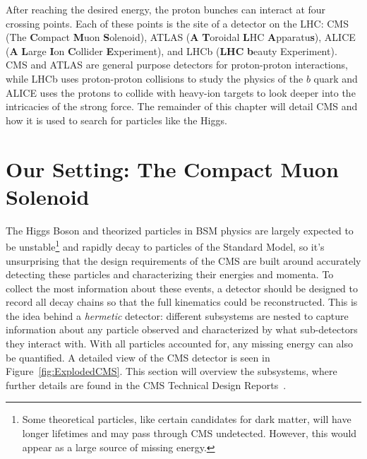 After reaching the desired energy, the proton bunches can interact at four crossing points. Each of these points is the site of a detector on the LHC: CMS (The \textbf{C}ompact \textbf{M}uon \textbf{S}olenoid), ATLAS (\textbf{A} \textbf{T}oroidal \textbf{L}HC \textbf{A}pparatu\textbf{s}), ALICE (\textbf{A} \textbf{L}arge \textbf{I}on \textbf{C}ollider \textbf{E}xperiment), and LHCb (\textbf{LHC} \textbf{b}eauty Experiment). CMS and ATLAS are general purpose detectors for proton-proton interactions, while LHCb uses proton-proton collisions to study the physics of the $b$ quark and ALICE uses the protons to collide with heavy-ion targets to look deeper into the intricacies of the strong force. The remainder of this chapter will detail CMS and how it is used to search for particles like the Higgs.

\section{Our Setting: The Compact Muon Solenoid}
\label{sec:CMS}

The Higgs Boson and theorized particles in BSM physics are largely expected to be unstable\footnote{Some theoretical particles, like certain candidates for dark matter, will have longer lifetimes and may pass through CMS undetected. However, this would appear as a large source of missing energy.} and rapidly decay to particles of the Standard Model, so it's unsurprising that the design requirements of the CMS are built around accurately detecting these particles and characterizing their energies and momenta. To collect the most information about these events, a detector should be designed to record all decay chains so that the full kinematics could be reconstructed. This is the idea behind a \textit{hermetic} detector: different subsystems are nested to capture information about any particle observed and characterized by what sub-detectors they interact with. With all particles accounted for, any missing energy can also be quantified. A detailed view of the CMS detector is seen in Figure~\ref{fig:ExplodedCMS}. This section will overview the subsystems, where further details are found in the CMS Technical Design Reports~\cite{CMSTDR:Vol1,CMSTDR:Vol2}.

